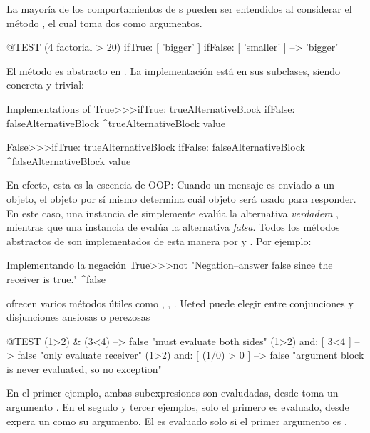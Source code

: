\documentclass[a4paper,10pt,twoside]{book}
\begin{document}
La mayor\'ia de los comportamientos de s pueden ser entendidos al considerar el m\'etodo  , el cual toma dos  como argumentos.

\begin{code}{@TEST}
(4 factorial > 20) ifTrue: [ 'bigger' ] ifFalse: [ 'smaller' ] --> 'bigger'
\end{code}

El m\'etodo es abstracto en .
La implementaci\'on est\'a en sus subclases, siendo concreta y trivial:

\begin{method}{Implementations of }
True>>>ifTrue: trueAlternativeBlock ifFalse: falseAlternativeBlock 
    ^trueAlternativeBlock value

False>>>ifTrue: trueAlternativeBlock ifFalse: falseAlternativeBlock 
    ^falseAlternativeBlock value
\end{method}

En efecto, esta es la escencia de OOP: Cuando un mensaje es enviado a un objeto, el objeto por s\'i mismo determina cu\'al objeto ser\'a usado para responder. En este caso, una instancia de   simplemente eval\'ua la alternativa \emph{verdadera} , mientras que una instancia de   eval\'ua la alternativa \emph{falsa}. Todos los m\'etodos abstractos de  son implementados de esta manera por  y . Por ejemplo:

\begin{method}{Implementando la negaci\'on}
True>>>not
    "Negation--answer false since the receiver is true."
    ^false
\end{method}

 ofrecen varios m\'etodos \'utiles como , , . Ueted puede elegir entre conjunciones y disjunciones ansiosas o perezosas

\begin{code}{@TEST}
(1>2) & (3<4)              --> false    "must evaluate both sides"
(1>2) and: [ 3<4 ]        --> false    "only evaluate receiver"
(1>2) and: [ (1/0) > 0 ] --> false    "argument block is never evaluated, so no exception"
\end{code}

En el primer ejemplo, ambas subexpresiones  son evaludadas, desde   toma un argumento .
En el segudo y tercer ejemplos, solo el primero es evaluado, desde  expera un  como su argumento.  El es evaluado solo si el primer argumento es .
\end{document}
